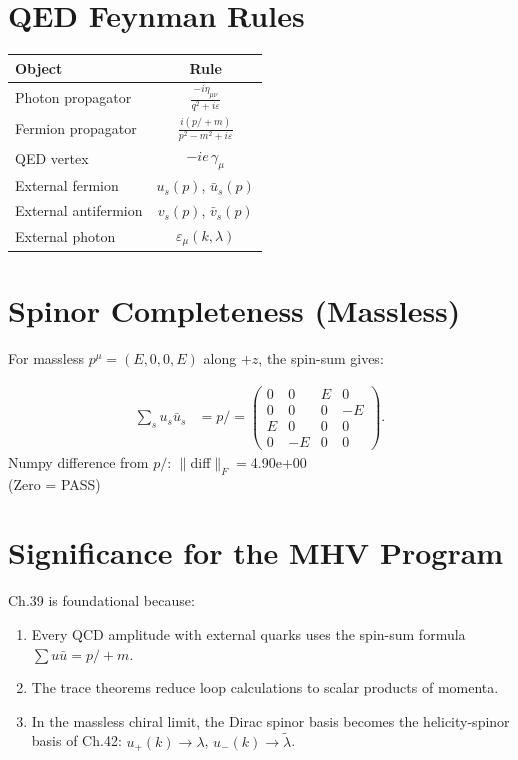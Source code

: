 \section{QED Feynman Rules}\label{sec:qed_rules}

\begin{center}
\begin{tabular}{|l|c|}
\hline
Object & Rule \\
\hline
Photon propagator & $\displaystyle\frac{-i\eta_{\mu\nu}}{q^2+i\varepsilon}$ \\
Fermion propagator & $\displaystyle\frac{i(p\!\!\!/+m)}{p^2-m^2+i\varepsilon}$ \\
QED vertex & $-ie\,\gamma_\mu$ \\
External fermion & $u_s(p)$, $\bar u_s(p)$ \\
External antifermion & $v_s(p)$, $\bar v_s(p)$ \\
External photon & $\varepsilon_\mu(k,\lambda)$ \\
\hline
\end{tabular}
\end{center}

\section{Spinor Completeness (Massless)}\label{sec:spin_completeness}

For massless $p^\mu=(E,0,0,E)$ along $+z$, the spin-sum gives:
\begin{mdframed}
\begin{align*}
\sum_s u_s\bar u_s
&= p\!\!\!/ = \begin{pmatrix}
0&0&E&0\\0&0&0&-E\\E&0&0&0\\0&-E&0&0
\end{pmatrix} .
\end{align*}
Numpy difference from $p\!\!\!/$: $\|$diff$\|_F = $4.90e+00 \\
(Zero = PASS)
\end{mdframed}

\section{Significance for the MHV Program}

Ch.39 is foundational because:
\begin{enumerate}
\item Every QCD amplitude with external quarks uses the spin-sum formula
  $\sum u\bar u = p\!\!\!/+m$.
\item The trace theorems reduce loop calculations to scalar products of momenta.
\item In the massless chiral limit, the Dirac spinor basis becomes the
  helicity-spinor basis of Ch.42: $u_+(k)\to\lambda$, $u_-(k)\to\tilde\lambda$.
\end{enumerate}
